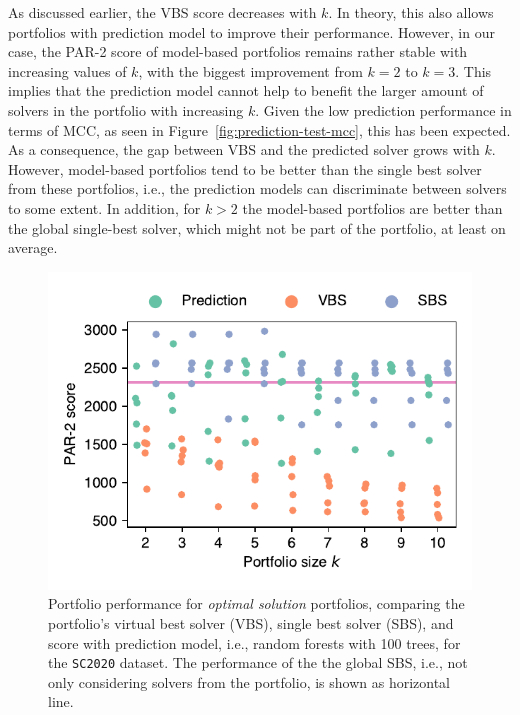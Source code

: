 \documentclass[conference]{IEEEtran}
\begin{document}
As discussed earlier, the VBS score decreases with $k$.
In theory, this also allows portfolios with prediction model to improve their performance.
However, in our case, the PAR-2 score of model-based portfolios remains rather stable with increasing values of $k$, with the biggest improvement from $k=2$ to $k=3$.
This implies that the prediction model cannot help to benefit the larger amount of solvers in the portfolio with increasing $k$. %
Given the low prediction performance in terms of MCC, as seen in Figure~\ref{fig:prediction-test-mcc}, this has been expected.
As a consequence, the gap between VBS and the predicted solver grows with $k$.
However, model-based portfolios tend to be better than the single best solver from these portfolios, i.e., the prediction models can discriminate between solvers to some extent.
In addition, for $k > 2$ the model-based portfolios are better than the global single-best solver, which might not be part of the portfolio, at least on average.

\begin{figure}[t]
	\centering
	\includegraphics[width=0.9\columnwidth]{plots/prediction-test-objective-optimal-2020.pdf}
	\caption{Portfolio performance for \emph{optimal solution} portfolios, comparing the portfolio's virtual best solver (VBS), single best solver (SBS), and score with prediction model, i.e., random forests with 100 trees, for the \texttt{SC2020} dataset. The performance of the the global SBS, i.e., not only considering solvers from the portfolio, is shown as horizontal line.}
	\label{fig:prediction-test-objective-optimal-2020}
\end{figure}
\end{document}
